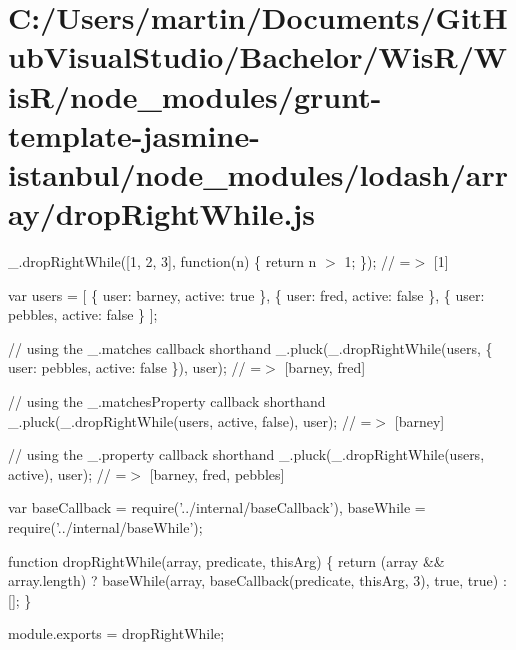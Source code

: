 \hypertarget{_c_1_2_users_2martin_2_documents_2_git_hub_visual_studio_2_bachelor_2_wis_r_2_wis_r_2node_moduleaa409de786dd475774e1a346d03d13b1}{}\section{C\+:/\+Users/martin/\+Documents/\+Git\+Hub\+Visual\+Studio/\+Bachelor/\+Wis\+R/\+Wis\+R/node\+\_\+modules/grunt-\/template-\/jasmine-\/istanbul/node\+\_\+modules/lodash/array/drop\+Right\+While.\+js}
\+\_\+.\+drop\+Right\+While(\mbox{[}1, 2, 3\mbox{]}, function(n) \{ return n $>$ 1; \}); // =$>$ \mbox{[}1\mbox{]}

var users = \mbox{[} \{ \textquotesingle{}user\textquotesingle{}\+: \textquotesingle{}barney\textquotesingle{}, \textquotesingle{}active\textquotesingle{}\+: true \}, \{ \textquotesingle{}user\textquotesingle{}\+: \textquotesingle{}fred\textquotesingle{}, \textquotesingle{}active\textquotesingle{}\+: false \}, \{ \textquotesingle{}user\textquotesingle{}\+: \textquotesingle{}pebbles\textquotesingle{}, \textquotesingle{}active\textquotesingle{}\+: false \} \mbox{]};

// using the {\ttfamily \+\_\+.\+matches} callback shorthand \+\_\+.\+pluck(\+\_\+.\+drop\+Right\+While(users, \{ \textquotesingle{}user\textquotesingle{}\+: \textquotesingle{}pebbles\textquotesingle{}, \textquotesingle{}active\textquotesingle{}\+: false \}), \textquotesingle{}user\textquotesingle{}); // =$>$ \mbox{[}\textquotesingle{}barney\textquotesingle{}, \textquotesingle{}fred\textquotesingle{}\mbox{]}

// using the {\ttfamily \+\_\+.\+matches\+Property} callback shorthand \+\_\+.\+pluck(\+\_\+.\+drop\+Right\+While(users, \textquotesingle{}active\textquotesingle{}, false), \textquotesingle{}user\textquotesingle{}); // =$>$ \mbox{[}\textquotesingle{}barney\textquotesingle{}\mbox{]}

// using the {\ttfamily \+\_\+.\+property} callback shorthand \+\_\+.\+pluck(\+\_\+.\+drop\+Right\+While(users, \textquotesingle{}active\textquotesingle{}), \textquotesingle{}user\textquotesingle{}); // =$>$ \mbox{[}\textquotesingle{}barney\textquotesingle{}, \textquotesingle{}fred\textquotesingle{}, \textquotesingle{}pebbles\textquotesingle{}\mbox{]}


\begin{DoxyCodeInclude}
var baseCallback = require(\textcolor{stringliteral}{'../internal/baseCallback'}),
    baseWhile = require(\textcolor{stringliteral}{'../internal/baseWhile'});

\textcolor{keyword}{function} dropRightWhile(array, predicate, thisArg) \{
  \textcolor{keywordflow}{return} (array && array.length)
    ? baseWhile(array, baseCallback(predicate, thisArg, 3), \textcolor{keyword}{true}, \textcolor{keyword}{true})
    : [];
\}

module.exports = dropRightWhile;
\end{DoxyCodeInclude}
 
